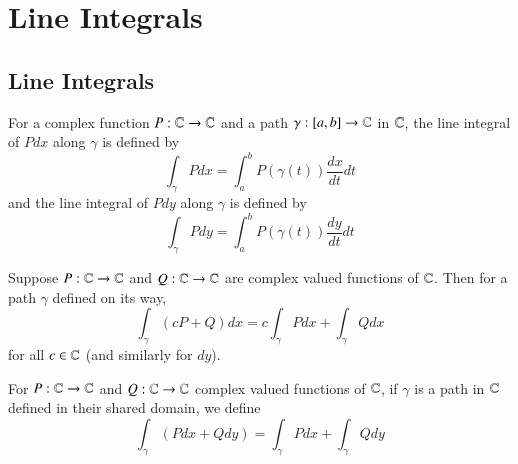 %
%
%
\chapter{Line Integrals}
\label{LineInt} %


\section{Line Integrals}


\begin{definition}
    For a complex function $P:\mathbb C\rightarrow \mathbb C$ and a path $\gamma:[a,b]\rightarrow \mathbb C$ in $\mathbb C$, the line integral of $Pdx$ along $\gamma$ is defined by \begin{equation*}
        \int_{\gamma}Pdx = \int_{a}^{b}P(\gamma(t))\frac{dx}{dt}dt
    \end{equation*}
    and the line integral of $Pdy$ along $\gamma$ is defined by \begin{equation*}
        \int_{\gamma}Pdy = \int_{a}^{b}P(\gamma(t))\frac{dy}{dt}dt
    \end{equation*}
\end{definition}


\begin{proposition}
    Suppose $P:\mathbb C\rightarrow \mathbb C$ and $Q:\mathbb C\rightarrow \mathbb C$ are complex valued functions of $\mathbb C$. Then for a path $\gamma$ defined on its way, \begin{equation*}
        \int_{\gamma}(cP+Q)dx = c\int_{\gamma}Pdx+\int_{\gamma}Qdx
    \end{equation*}
    for all $c \in \mathbb C$ (and similarly for $dy$).
\end{proposition}

\begin{definition}
    For $P:\mathbb C\rightarrow \mathbb C$ and $Q:\mathbb C\rightarrow \mathbb C$ complex valued functions of $\mathbb C$, if $\gamma$ is a path in $\mathbb C$ defined in their shared domain, we define \begin{equation*}
        \int_{\gamma}(Pdx+Qdy) = \int_{\gamma}Pdx+\int_{\gamma}Qdy
    \end{equation*}
\end{definition}

